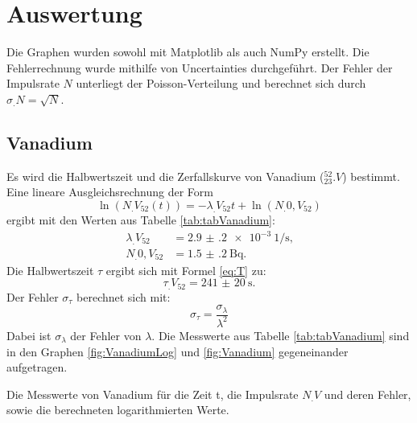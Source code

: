 \section{Auswertung}
\label{sec:Auswertung}

Die Graphen wurden sowohl mit Matplotlib \cite{matplotlib} als auch NumPy \cite{numpy} erstellt. Die
Fehlerrechnung wurde mithilfe von Uncertainties \cite{uncertainties} durchgeführt. Der Fehler der Impulsrate $N$ unterliegt der Poisson-Verteilung und berechnet sich durch $\sigma_.N=\sqrt{N}$. 

\subsection{Vanadium}

Es wird die Halbwertszeit und die Zerfallskurve von Vanadium ($^{52}_{23}.V$) bestimmt.
Eine lineare Ausgleichsrechnung der Form \[\ln(N_.{V_{52}}(t))=-\lambda_.{V_{52}} t+\ln(N_.{0,V_{52}})\] ergibt mit den Werten aus Tabelle \ref{tab:tabVanadium}:
\begin{align*}
\lambda_.{V_{52}}	&= \SI{2.9(2)e-3}{1\per\second}\text{,}\\
N_.{0,V_{52}} 		&= \SI{1.5(2)}{\becquerel}\text{.}
\end{align*}
Die Halbwertszeit $\tau$ ergibt sich mit Formel \eqref{eq:T} zu:
\begin{equation*}
\tau_.{V_{52}} = \SI{241(20)}{\second}\text{.}
\end{equation*}
Der Fehler $\sigma_{\tau}$ berechnet sich mit:
\begin{equation}
\sigma_{\tau} = \frac{\sigma_{\lambda}}{\lambda^2}\label{eq:sigma_tau}
\end{equation}
Dabei ist $\sigma_{\lambda}$ der Fehler von $\lambda$. Die Messwerte aus Tabelle \ref{tab:tabVanadium} sind in den Graphen \ref{fig:VanadiumLog} und \ref{fig:Vanadium} gegeneinander aufgetragen.

\begin{table}
	\centering
	\caption{Die Messwerte von Vanadium für die Zeit t, die Impulsrate $N_.V$ und deren Fehler, sowie die berechneten logarithmierten Werte.}
	
	\label{tab:tabVanadium}
\end{table}

